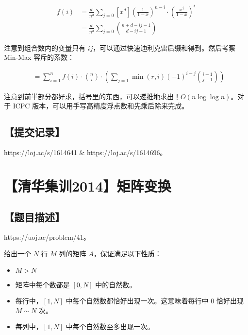 \documentclass[UTF8,12pt,a4paper]{ctexart}
\begin{document}
	$$
	\begin{aligned}
		f(i)
		&= \frac {d!}{n^{\bar{d}}} \sum_{j=0} [x^d]\left(\frac 1{1-x}\right)^{n-i}\cdot \left(\frac {x^j}{1-x}\right)^{i}\\
		&= \frac {d!}{n^{\bar{d}}} \sum_{j=0} \binom{n+d-ij-1}{d-ij-1}
	\end{aligned}
	$$
	
	注意到组合数内的变量只有 $ij$，可以通过快速迪利克雷后缀和得到。然后考察 Min-Max 容斥的系数：
	
	$$
	\begin{aligned}
		&= \sum_{i=1}^n f(i)\cdot \binom{n}{i}\cdot\left( \sum_{j=1}{\min(r,i)} (-1)^{i-j}\binom{i-1}{j-1} \right)
	\end{aligned}
	$$
	
	注意到前半部分都好求，括号里的东西，可以递推地求出！$O(n\log\log n)$。对于 ICPC 版本，可以用手写高精度浮点数和先乘后除来完成。
	
	\subsection*{【提交记录】}
	
	https://loj.ac/s/1614641 \& https://loj.ac/s/1614696。
	
	
	\section*{【清华集训2014】矩阵变换}
	
	\subsection*{【题目描述】}
	
	https://uoj.ac/problem/41。
	
	给出一个 $N$ 行 $M$ 列的矩阵 $A$，保证满足以下性质：
	
	\begin{itemize}
		\item $M>N$
		\item 矩阵中每个数都是 $[0,N]$ 中的自然数。
		\item 每行中，$[1,N]$ 中每个自然数都恰好出现一次。这意味着每行中 $0$ 恰好出现 $M\sim N$ 次。
		\item 每列中，$[1,N]$ 中每个自然数至多出现一次。
		
	\end{itemize}
	
\end{document}

